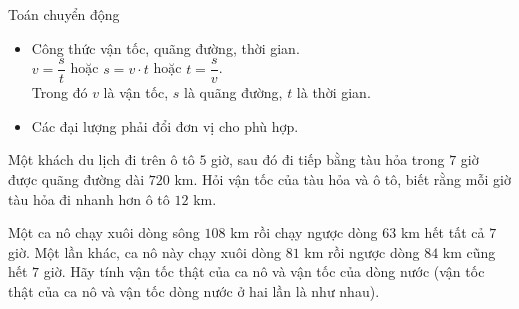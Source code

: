 \begin{dang}{Toán chuyển động}
	\begin{itemize}
		\item Công thức vận tốc, quãng đường, thời gian.\\
		$v=\dfrac{s}{t}$ hoặc $s=v\cdot t$ hoặc $t=\dfrac{s}{v}$.\\
		Trong đó $v$ là vận tốc, $s$ là quãng đường, $t$ là thời gian.
		\item Các đại lượng phải đổi đơn vị cho phù hợp.
	\end{itemize}
\end{dang}
\begin{bt}
	Một khách du lịch đi trên ô tô $5$ giờ, sau đó đi tiếp bằng tàu hỏa trong $7$ giờ được quãng đường dài $720$ km. Hỏi vận tốc của tàu hỏa và ô tô, biết rằng mỗi giờ tàu hỏa đi nhanh hơn ô tô $12$ km.
\end{bt}
\begin{bt}
	Một ca nô chạy xuôi dòng sông $108$ km rồi chạy ngược dòng $63$ km hết tất cả $7$ giờ. Một lần khác, ca nô này chạy xuôi dòng $81$ km rồi ngược dòng $84$ km cũng hết $7$ giờ. Hãy tính vận tốc thật của ca nô và vận tốc của dòng nước (vận tốc thật của ca nô và vận tốc dòng nước ở hai lần là như nhau).
\end{bt}
